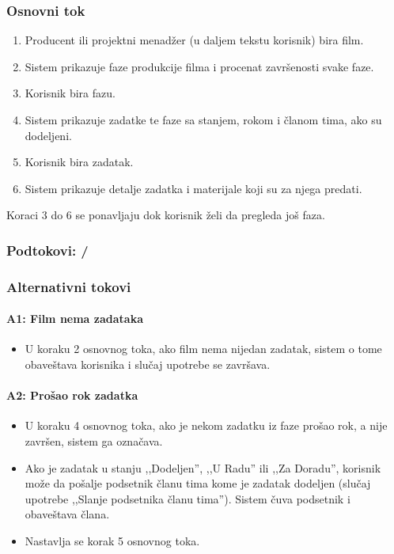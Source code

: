 \subsubsection*{Osnovni tok}
\begin{enumerate}
    \item Producent ili projektni menadžer (u daljem tekstu korisnik) bira film.
    \item Sistem prikazuje faze produkcije filma i procenat završenosti svake faze.
    \item Korisnik bira fazu.
    \item Sistem prikazuje zadatke te faze sa stanjem, rokom i članom tima, ako su dodeljeni.
    \item Korisnik bira zadatak.
    \item Sistem prikazuje detalje zadatka i materijale koji su za njega predati.
\end{enumerate}

Koraci 3 do 6 se ponavljaju dok korisnik želi da pregleda još faza.

\subsubsection*{Podtokovi: /}

\subsubsection*{Alternativni tokovi}

\paragraph*{A1: Film nema zadataka}
\begin{itemize}
    \item U koraku 2 osnovnog toka, ako film nema nijedan zadatak, sistem o tome obaveštava korisnika i slučaj upotrebe se završava.
\end{itemize}

\paragraph*{A2: Prošao rok zadatka}
\begin{itemize}
    \item U koraku 4 osnovnog toka, ako je nekom zadatku iz faze prošao rok, a nije završen, sistem ga označava.
    \item Ako je zadatak u stanju ,,Dodeljen'', ,,U Radu'' ili ,,Za Doradu'', korisnik može da pošalje podsetnik članu tima kome je zadatak dodeljen (slučaj upotrebe ,,Slanje podsetnika članu tima''). Sistem čuva podsetnik i obaveštava člana.
    \item Nastavlja se korak 5 osnovnog toka.
\end{itemize}

